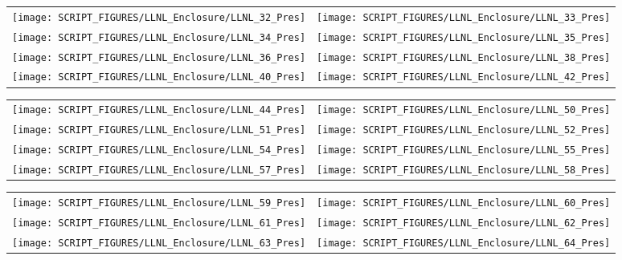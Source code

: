 \begin{figure}[!ht]
\begin{tabular*}{\textwidth}{l@{\extracolsep{\fill}}r}
\texttt{[image: SCRIPT\_FIGURES/LLNL\_Enclosure/LLNL\_32\_Pres]} &
\texttt{[image: SCRIPT\_FIGURES/LLNL\_Enclosure/LLNL\_33\_Pres]} \\
\texttt{[image: SCRIPT\_FIGURES/LLNL\_Enclosure/LLNL\_34\_Pres]} &
\texttt{[image: SCRIPT\_FIGURES/LLNL\_Enclosure/LLNL\_35\_Pres]} \\
\texttt{[image: SCRIPT\_FIGURES/LLNL\_Enclosure/LLNL\_36\_Pres]} &
\texttt{[image: SCRIPT\_FIGURES/LLNL\_Enclosure/LLNL\_38\_Pres]} \\
\texttt{[image: SCRIPT\_FIGURES/LLNL\_Enclosure/LLNL\_40\_Pres]} &
\texttt{[image: SCRIPT\_FIGURES/LLNL\_Enclosure/LLNL\_42\_Pres]}
\end{tabular*}
\label{LLNL_Enclosure_Pres_4}
\end{figure}

\begin{figure}[!ht]
\begin{tabular*}{\textwidth}{l@{\extracolsep{\fill}}r}
\texttt{[image: SCRIPT\_FIGURES/LLNL\_Enclosure/LLNL\_44\_Pres]} &
\texttt{[image: SCRIPT\_FIGURES/LLNL\_Enclosure/LLNL\_50\_Pres]} \\
\texttt{[image: SCRIPT\_FIGURES/LLNL\_Enclosure/LLNL\_51\_Pres]} &
\texttt{[image: SCRIPT\_FIGURES/LLNL\_Enclosure/LLNL\_52\_Pres]} \\
\texttt{[image: SCRIPT\_FIGURES/LLNL\_Enclosure/LLNL\_54\_Pres]} &
\texttt{[image: SCRIPT\_FIGURES/LLNL\_Enclosure/LLNL\_55\_Pres]} \\
\texttt{[image: SCRIPT\_FIGURES/LLNL\_Enclosure/LLNL\_57\_Pres]} &
\texttt{[image: SCRIPT\_FIGURES/LLNL\_Enclosure/LLNL\_58\_Pres]}
\end{tabular*}
\label{LLNL_Enclosure_Pres_5}
\end{figure}

\begin{figure}[!ht]
\begin{tabular*}{\textwidth}{l@{\extracolsep{\fill}}r}
\texttt{[image: SCRIPT\_FIGURES/LLNL\_Enclosure/LLNL\_59\_Pres]} &
\texttt{[image: SCRIPT\_FIGURES/LLNL\_Enclosure/LLNL\_60\_Pres]} \\
\texttt{[image: SCRIPT\_FIGURES/LLNL\_Enclosure/LLNL\_61\_Pres]} &
\texttt{[image: SCRIPT\_FIGURES/LLNL\_Enclosure/LLNL\_62\_Pres]} \\
\texttt{[image: SCRIPT\_FIGURES/LLNL\_Enclosure/LLNL\_63\_Pres]} &
\texttt{[image: SCRIPT\_FIGURES/LLNL\_Enclosure/LLNL\_64\_Pres]}
\end{tabular*}
\label{LLNL_Enclosure_Pres_6}
\end{figure}

